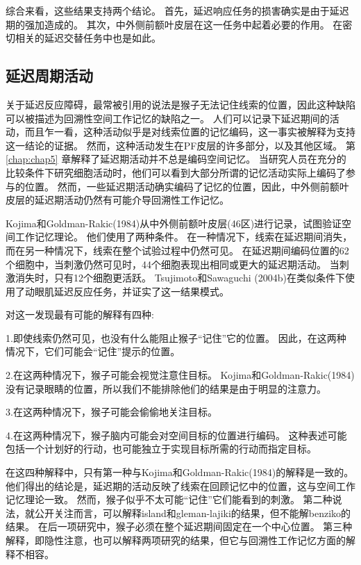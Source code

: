 综合来看，这些结果支持两个结论。
首先，延迟响应任务的损害确实是由于延迟期的强加造成的。
其次，中外侧前额叶皮层在这一任务中起着必要的作用。
在密切相关的延迟交替任务中也是如此。



\subsection{延迟周期活动}

关于延迟反应障碍，最常被引用的说法是猴子无法记住线索的位置，因此这种缺陷可以被描述为回溯性空间工作记忆的缺陷之一。
人们可以记录下延迟期间的活动，而且乍一看，这种活动似乎是对线索位置的记忆编码，这一事实被解释为支持这一结论的证据。
然而，这种活动发生在PF皮层的许多部分，以及其他区域。
第 \ref{chap:chap5} 章解释了延迟期活动并不总是编码空间记忆。
当研究人员在充分的比较条件下研究细胞活动时，他们可以看到大部分所谓的记忆活动实际上编码了参与的位置。
然而，一些延迟期活动确实编码了记忆的位置，因此，中外侧前额叶皮层的延迟期活动仍然有可能介导回溯性工作记忆。


Kojima和Goldman-Rakic(1984)从中外侧前额叶皮层(46区)进行记录，试图验证空间工作记忆理论。
他们使用了两种条件。
在一种情况下，线索在延迟期间消失，而在另一种情况下，线索在整个试验过程中仍然可见。
在延迟期间编码位置的62个细胞中，当刺激仍然可见时，44个细胞表现出相同或更大的延迟期活动。
当刺激消失时，只有12个细胞更活跃。
Tsujimoto和Sawaguchi (2004b)在类似条件下使用了动眼肌延迟反应任务，并证实了这一结果模式。


对这一发现最有可能的解释有四种:
\par


1.即使线索仍然可见，也没有什么能阻止猴子“记住”它的位置。
因此，在这两种情况下，它们可能会“记住”提示的位置。
\par


2.在这两种情况下，猴子可能会视觉注意住目标。
Kojima和Goldman-Rakic(1984)没有记录眼睛的位置，所以我们不能排除他们的结果是由于明显的注意力。
\par


3.在这两种情况下，猴子可能会偷偷地关注目标。
\par


4.在这两种情况下，猴子脑内可能会对空间目标的位置进行编码。
这种表述可能包括一个计划好的行动，也可能独立于实现目标所需的行动而指定目标。


在这四种解释中，只有第一种与Kojima和Goldman-Rakic(1984)的解释是一致的。
他们得出的结论是，延迟期的活动反映了线索在回顾记忆中的位置，这与空间工作记忆理论一致。
然而，猴子似乎不太可能“记住”它们能看到的刺激。
第二种说法，就公开关注而言，可以解释island和gleman-lajiki的结果，但不能解benziko的结果。
在后一项研究中，猴子必须在整个延迟期间固定在一个中心位置。
第三种解释，即隐性注意，也可以解释两项研究的结果，但它与回溯性工作记忆方面的解释不相容。


